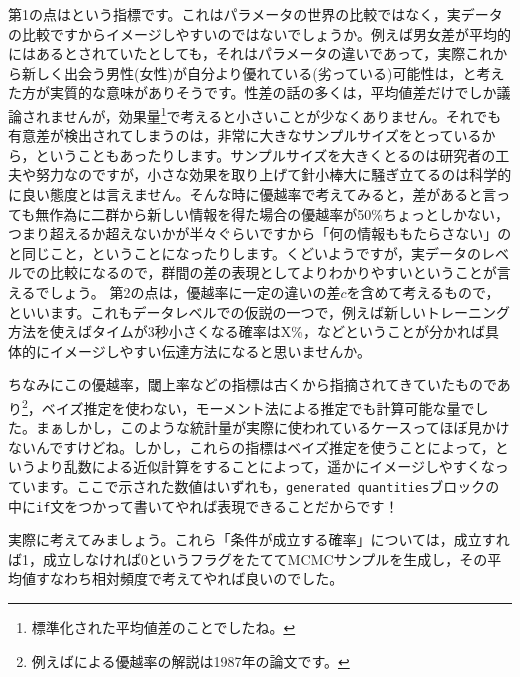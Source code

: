 \documentclass{ltjsbook}
\begin{document}
第1の点はという指標です。これはパラメータの世界の比較ではなく，実データの比較ですからイメージしやすいのではないでしょうか。例えば男女差が平均的にはあるとされていたとしても，それはパラメータの違いであって，実際これから新しく出会う男性(女性)が自分より優れている(劣っている)可能性は，と考えた方が実質的な意味がありそうです。性差の話の多くは，平均値差だけでしか議論されませんが，効果量\footnote{標準化された平均値差のことでしたね。}で考えると小さいことが少なくありません。それでも有意差が検出されてしまうのは，非常に大きなサンプルサイズをとっているから，ということもあったりします。サンプルサイズを大きくとるのは研究者の工夫や努力なのですが，小さな効果を取り上げて針小棒大に騒ぎ立てるのは科学的に良い態度とは言えません。そんな時に優越率で考えてみると，差があると言っても無作為に二群から新しい情報を得た場合の優越率が50\%ちょっとしかない，つまり超えるか超えないかが半々ぐらいですから「何の情報ももたらさない」のと同じこと，ということになったりします。くどいようですが，実データのレベルでの比較になるので，群間の差の表現としてよりわかりやすいということが言えるでしょう。
第2の点は，優越率に一定の違いの差$c$を含めて考えるもので，といいます。これもデータレベルでの仮説の一つで，例えば新しいトレーニング方法を使えばタイムが3秒小さくなる確率はX\%，などということが分かれば具体的にイメージしやすい伝達方法になると思いませんか。

ちなみにこの優越率，閾上率などの指標は古くから指摘されてきていたものであり\footnote{例えば\citet{Haebara1987}による優越率の解説は1987年の論文です。}，ベイズ推定を使わない，モーメント法による推定でも計算可能な量でした。まぁしかし，このような統計量が実際に使われているケースってほぼ見かけないんですけどね。しかし，これらの指標はベイズ推定を使うことによって，というより乱数による近似計算をすることによって，遥かにイメージしやすくなっています。ここで示された数値はいずれも，\verb|generated quantities|ブロックの中に\verb|if|文をつかって書いてやれば表現できることだからです！

実際に考えてみましょう。これら「条件が成立する確率」については，成立すれば1，成立しなければ0というフラグをたててMCMCサンプルを生成し，その平均値すなわち相対頻度で考えてやれば良いのでした。
\end{document}
